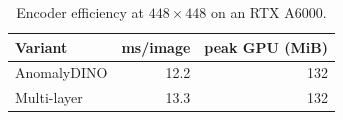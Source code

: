 \begin{table}[t]
\centering
\small
\caption{Encoder efficiency at $448\times448$ on an RTX A6000.}
\label{tab:efficiency}
\begin{tabular}{lrr}
\toprule
Variant & ms/image & peak GPU (MiB) \\
\midrule
AnomalyDINO & 12.2 & 132 \\
Multi-layer & 13.3 & 132 \\
\bottomrule
\end{tabular}
\end{table}
